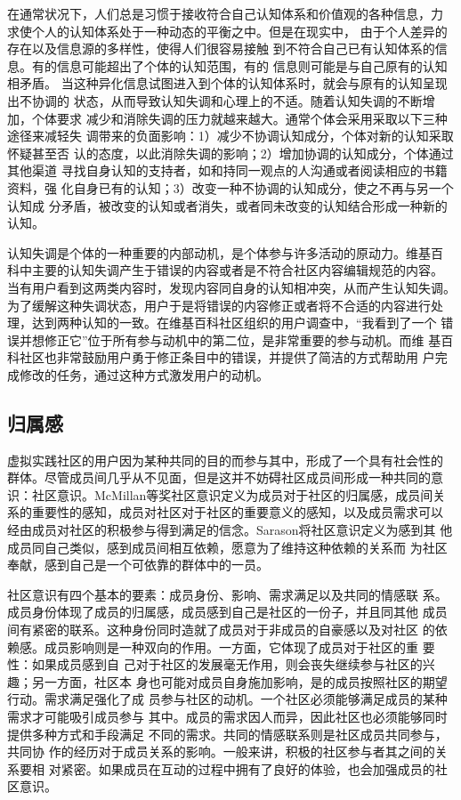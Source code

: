 在通常状况下，人们总是习惯于接收符合自己认知体系和价值观的各种信息，力
求使个人的认知体系处于一种动态的平衡之中。但是在现实中，
由于个人差异的存在以及信息源的多样性，使得人们很容易接触
到不符合自己已有认知体系的信息。有的信息可能超出了个体的认知范围，有的
信息则可能是与自己原有的认知相矛盾。
当这种异化信息试图进入到个体的认知体系时，就会与原有的认知呈现出不协调的
状态，从而导致认知失调和心理上的不适。随着认知失调的不断增加，个体要求
减少和消除失调的压力就越来越大。通常个体会采用采取以下三种途径来减轻失
调带来的负面影响：1）减少不协调认知成分，个体对新的认知采取怀疑甚至否
认的态度，以此消除失调的影响；2）增加协调的认知成分，个体通过其他渠道
寻找自身认知的支持者，如和持同一观点的人沟通或者阅读相应的书籍资料，强
化自身已有的认知；3）改变一种不协调的认知成分，使之不再与另一个认知成
分矛盾，被改变的认知或者消失，或者同未改变的认知结合形成一种新的认知。 

认知失调是个体的一种重要的内部动机，是个体参与许多活动的原动力。维基百
科中主要的认知失调产生于错误的内容或者是不符合社区内容编辑规范的内容。
当有用户看到这两类内容时，发现内容同自身的认知相冲突，从而产生认知失调。
为了缓解这种失调状态，用户于是将错误的内容修正或者将不合适的内容进行处
理，达到两种认知的一致。在维基百科社区组织的用户调查中，“我看到了一个
错误并想修正它”位于所有参与动机中的第二位，是非常重要的参与动机。而维
基百科社区也非常鼓励用户勇于修正条目中的错误，并提供了简洁的方式帮助用
户完成修改的任务，通过这种方式激发用户的动机。

\subsection{归属感}
\label{sec:sense-of-belongings}

虚拟实践社区的用户因为某种共同的目的而参与其中，形成了一个具有社会性的
群体。尽管成员间几乎从不见面，但是这并不妨碍社区成员间形成一种共同的意
识：社区意识。McMillan等奖社区意识定义为成员对于社区的归属感，成员间关
系的重要性的感知，成员对社区对于社区的重要意义的感知，以及成员需求可以
经由成员对社区的积极参与得到满足的信念\cite{mcmillan1986sense}。Sarason将社区意识定义为感到其
他成员同自己类似，感到成员间相互依赖，愿意为了维持这种依赖的关系而
为社区奉献，感到自己是一个可依靠的群体中的一员\cite{sarason1988psychological}。

社区意识有四个基本的要素：成员身份、影响、需求满足以及共同的情感联
系。成员身份体现了成员的归属感，成员感到自己是社区的一份子，并且同其他
成员间有紧密的联系。这种身份同时造就了成员对于非成员的自豪感以及对社区
的依赖感。成员影响则是一种双向的作用。一方面，它体现了成员对于社区的重
要性：如果成员感到自
己对于社区的发展毫无作用，则会丧失继续参与社区的兴趣；另一方面，社区本
身也可能对成员自身施加影响，是的成员按照社区的期望行动。需求满足强化了成
员参与社区的动机。一个社区必须能够满足成员的某种需求才可能吸引成员参与
其中。成员的需求因人而异，因此社区也必须能够同时提供多种方式和手段满足
不同的需求。共同的情感联系则是社区成员共同参与，共同协
作的经历对于成员关系的影响。一般来讲，积极的社区参与者其之间的关系要相
对紧密。如果成员在互动的过程中拥有了良好的体验，也会加强成员的社区意识。


